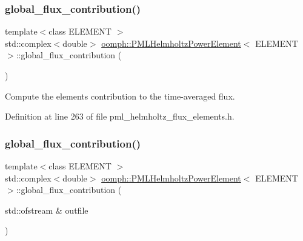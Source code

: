 \subsubsection{\texorpdfstring{global\+\_\+flux\+\_\+contribution()}{global\_flux\_contribution()}\hspace{0.1cm}{\footnotesize\ttfamily [1/2]}}
{\footnotesize\ttfamily template$<$class E\+L\+E\+M\+E\+NT $>$ \\
std\+::complex$<$double$>$ \hyperlink{classoomph_1_1PMLHelmholtzPowerElement}{oomph\+::\+P\+M\+L\+Helmholtz\+Power\+Element}$<$ E\+L\+E\+M\+E\+NT $>$\+::global\+\_\+flux\+\_\+contribution (\begin{DoxyParamCaption}{ }\end{DoxyParamCaption})\hspace{0.3cm}{\ttfamily [inline]}}



Compute the element\textquotesingle{}s contribution to the time-\/averaged flux. 



Definition at line 263 of file pml\+\_\+helmholtz\+\_\+flux\+\_\+elements.\+h.

\mbox{\label{classoomph_1_1PMLHelmholtzPowerElement_aeea5a41b8fc51cfe1ee1e49a84cbf66b}} 
\subsubsection{\texorpdfstring{global\+\_\+flux\+\_\+contribution()}{global\_flux\_contribution()}\hspace{0.1cm}{\footnotesize\ttfamily [2/2]}}
{\footnotesize\ttfamily template$<$class E\+L\+E\+M\+E\+NT $>$ \\
std\+::complex$<$double$>$ \hyperlink{classoomph_1_1PMLHelmholtzPowerElement}{oomph\+::\+P\+M\+L\+Helmholtz\+Power\+Element}$<$ E\+L\+E\+M\+E\+NT $>$\+::global\+\_\+flux\+\_\+contribution (\begin{DoxyParamCaption}\item[{std\+::ofstream \&}]{outfile }\end{DoxyParamCaption})\hspace{0.3cm}{\ttfamily [inline]}}



